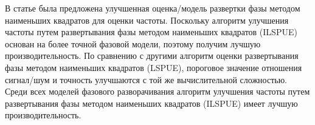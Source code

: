 В \cite{zhou2018improved} статье была предложена улучшенная оценка/модель развертки фазы методом наименьших квадратов для оценки частоты. Поскольку алгоритм улучшения частоты путем развертывания фазы методом наименьших квадратов (ILSPUE) основан на более точной фазовой модели, поэтому получим лучшую производительность. По сравнению с другими алгоритм  оценки развертывания фазы методом наименьших квадратов (LSPUE), пороговое значение отношения сигнал/шум и точность улучшаются с той же вычислительной сложностью. Среди всех моделей фазового разворачивания алгоритм улучшения частоты путем развертывания фазы методом наименьших квадратов (ILSPUE) имеет лучшую производительность.

%
%
%
